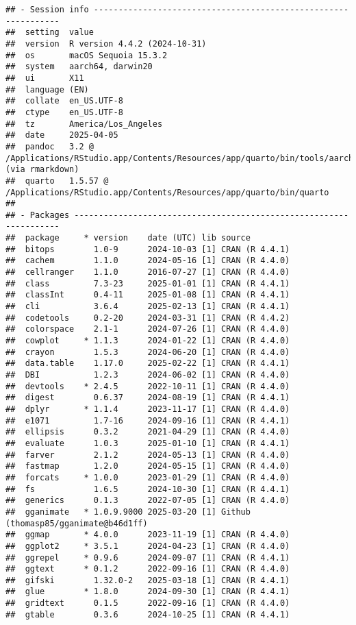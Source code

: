\documentclass[
]{article}
\begin{document}
\begin{verbatim}
## - Session info ---------------------------------------------------------------
##  setting  value
##  version  R version 4.4.2 (2024-10-31)
##  os       macOS Sequoia 15.3.2
##  system   aarch64, darwin20
##  ui       X11
##  language (EN)
##  collate  en_US.UTF-8
##  ctype    en_US.UTF-8
##  tz       America/Los_Angeles
##  date     2025-04-05
##  pandoc   3.2 @ /Applications/RStudio.app/Contents/Resources/app/quarto/bin/tools/aarch64/ (via rmarkdown)
##  quarto   1.5.57 @ /Applications/RStudio.app/Contents/Resources/app/quarto/bin/quarto
## 
## - Packages -------------------------------------------------------------------
##  package     * version    date (UTC) lib source
##  bitops        1.0-9      2024-10-03 [1] CRAN (R 4.4.1)
##  cachem        1.1.0      2024-05-16 [1] CRAN (R 4.4.0)
##  cellranger    1.1.0      2016-07-27 [1] CRAN (R 4.4.0)
##  class         7.3-23     2025-01-01 [1] CRAN (R 4.4.1)
##  classInt      0.4-11     2025-01-08 [1] CRAN (R 4.4.1)
##  cli           3.6.4      2025-02-13 [1] CRAN (R 4.4.1)
##  codetools     0.2-20     2024-03-31 [1] CRAN (R 4.4.2)
##  colorspace    2.1-1      2024-07-26 [1] CRAN (R 4.4.0)
##  cowplot     * 1.1.3      2024-01-22 [1] CRAN (R 4.4.0)
##  crayon        1.5.3      2024-06-20 [1] CRAN (R 4.4.0)
##  data.table    1.17.0     2025-02-22 [1] CRAN (R 4.4.1)
##  DBI           1.2.3      2024-06-02 [1] CRAN (R 4.4.0)
##  devtools    * 2.4.5      2022-10-11 [1] CRAN (R 4.4.0)
##  digest        0.6.37     2024-08-19 [1] CRAN (R 4.4.1)
##  dplyr       * 1.1.4      2023-11-17 [1] CRAN (R 4.4.0)
##  e1071         1.7-16     2024-09-16 [1] CRAN (R 4.4.1)
##  ellipsis      0.3.2      2021-04-29 [1] CRAN (R 4.4.0)
##  evaluate      1.0.3      2025-01-10 [1] CRAN (R 4.4.1)
##  farver        2.1.2      2024-05-13 [1] CRAN (R 4.4.0)
##  fastmap       1.2.0      2024-05-15 [1] CRAN (R 4.4.0)
##  forcats     * 1.0.0      2023-01-29 [1] CRAN (R 4.4.0)
##  fs            1.6.5      2024-10-30 [1] CRAN (R 4.4.1)
##  generics      0.1.3      2022-07-05 [1] CRAN (R 4.4.0)
##  gganimate   * 1.0.9.9000 2025-03-20 [1] Github (thomasp85/gganimate@b46d1ff)
##  ggmap       * 4.0.0      2023-11-19 [1] CRAN (R 4.4.0)
##  ggplot2     * 3.5.1      2024-04-23 [1] CRAN (R 4.4.0)
##  ggrepel     * 0.9.6      2024-09-07 [1] CRAN (R 4.4.1)
##  ggtext      * 0.1.2      2022-09-16 [1] CRAN (R 4.4.0)
##  gifski        1.32.0-2   2025-03-18 [1] CRAN (R 4.4.1)
##  glue        * 1.8.0      2024-09-30 [1] CRAN (R 4.4.1)
##  gridtext      0.1.5      2022-09-16 [1] CRAN (R 4.4.0)
##  gtable        0.3.6      2024-10-25 [1] CRAN (R 4.4.1)

\end{verbatim}
\end{document}
